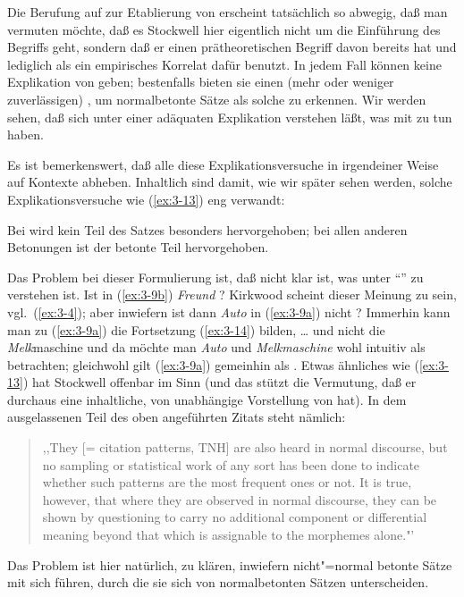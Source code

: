 \documentclass[output=paper]{langsci/langscibook}
\begin{document}
Die Berufung auf  zur Etablierung von  erscheint tatsächlich so abwegig, daß man vermuten möchte, daß es Stockwell hier eigentlich nicht um die Einführung des Begriffs  geht, sondern daß er einen prätheoretischen Begriff davon bereits hat und  lediglich als ein empirisches Korrelat dafür benutzt. In jedem Fall können  keine Explikation von  geben; bestenfalls bieten sie einen (mehr oder weniger zuverlässigen) , um normalbetonte Sätze als solche zu erkennen. Wir werden sehen, daß sich unter einer adäquaten Explikation verstehen läßt, was  mit  zu tun haben.

Es ist bemerkenswert, daß alle diese Explikationsversuche in irgendeiner Weise auf Kontexte abheben. Inhaltlich sind damit, wie wir später sehen werden, solche Explikationsversuche wie (\ref{ex:3-13}) eng verwandt:
\begin{exe}
	\ex \label{ex:3-13}
	Bei  wird kein Teil des Satzes besonders hervorgehoben;
bei allen anderen Betonungen ist der betonte Teil hervorgehoben.
\end{exe}
Das Problem bei dieser Formulierung ist, daß nicht klar ist, was unter "`"' zu verstehen ist. Ist \zb in (\ref{ex:3-9b}) \textit{Freund}
? Kirkwood scheint dieser Meinung zu
sein, vgl.\ (\ref{ex:3-4}); aber inwiefern ist dann \textit{Auto} in (\ref{ex:3-9a}) nicht
? Immerhin kann man zu (\ref{ex:3-9a}) die
Fortsetzung (\ref{ex:3-14}) bilden,
\ea
\label{ex:3-14}
\ldots{} und nicht die \textit{Melk}maschine
\z
und da möchte man \textit{Auto} und \textit{Melkmaschine} wohl
intuitiv als  betrachten; gleichwohl gilt (\ref{ex:3-9a}) 
gemeinhin als . Etwas ähnliches wie (\ref{ex:3-13}) hat
Stockwell offenbar im Sinn (und das stützt die Vermutung, daß er
durchaus eine inhaltliche, von  unabhängige
Vorstellung von  hat). In dem ausgelassenen Teil des
oben angeführten Zitats steht nämlich:
\begin{quotation}
  ,,They [= citation patterns, TNH] are also heard in normal discourse,
  but no sampling or statistical work of any sort has been done to
  indicate whether such patterns are the most frequent ones or not. It
  is true, however, that where they are observed in normal discourse,
  they can be shown by questioning to carry no additional component or
  differential meaning beyond that which is assignable to the
   morphemes alone."'\\
\citep[50;  von mir]{Schmerling76}
\end{quotation}
Das Problem ist hier natürlich, zu klären, inwiefern nicht"=normal betonte Sätze 
mit sich führen, durch die sie sich von normalbetonten Sätzen unterscheiden.
\end{document}

